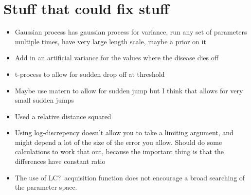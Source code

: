 \chapter{Stuff that could fix stuff}

\begin{itemize}
    \item Gaussian process has gaussian process for variance, run any set of parameters multiple times, have very large length scale, maybe a prior on it
    \item Add in an artificial variance for the values where the disease dies off
    \item t-process to allow for sudden drop off at threshold
    \item Maybe use matern to allow for sudden jump but I think that allows for very small sudden jumps
    \item Used a relative distance squared
    \item Using log-discrepency doesn't allow you to take a limiting argument, and might depend a lot of the size of the error you allow. Should do some calculations to work that out, because the important thing is that the differences have constant ratio
    \item The use of LC?\ acquisition function does not encourage a broad searching of the parameter space.
\end{itemize}